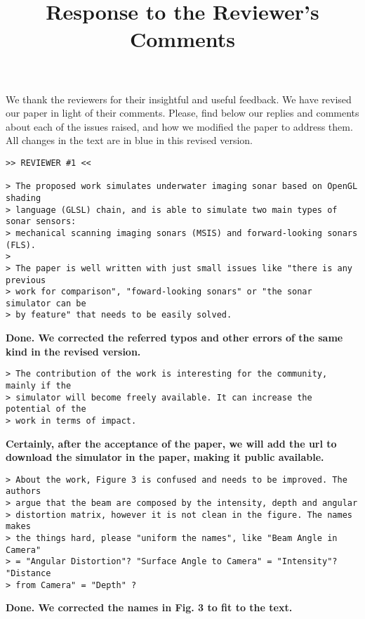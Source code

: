 \documentclass{article}
\title{Response to the Reviewer's Comments}
\begin{document}
\maketitle

We thank the reviewers for their insightful and useful feedback. We have
revised our paper in light of their comments. Please, find
below our replies and comments about each of the issues raised, and how
we modified the paper to address them. All changes in the text are in blue
in this revised version.

\begin{verbatim}
>> REVIEWER #1 <<

> The proposed work simulates underwater imaging sonar based on OpenGL shading
> language (GLSL) chain, and is able to simulate two main types of sonar sensors:
> mechanical scanning imaging sonars (MSIS) and forward-looking sonars (FLS).
>
> The paper is well written with just small issues like "there is any previous
> work for comparison", "foward-looking sonars" or "the sonar simulator can be
> by feature" that needs to be easily solved.
\end{verbatim}

\textbf{Done. We corrected the referred typos and other
errors of the same kind in the revised version.}

\begin{verbatim}
> The contribution of the work is interesting for the community, mainly if the
> simulator will become freely available. It can increase the potential of the
> work in terms of impact.
\end{verbatim}

\textbf{Certainly, after the acceptance of the paper, we will add the url to
download the simulator in the paper, making it public available.}

\begin{verbatim}
> About the work, Figure 3 is confused and needs to be improved. The authors
> argue that the beam are composed by the intensity, depth and angular
> distortion matrix, however it is not clean in the figure. The names makes
> the things hard, please "uniform the names", like "Beam Angle in Camera"
> = "Angular Distortion"? "Surface Angle to Camera" = "Intensity"? "Distance
> from Camera" = "Depth" ?
\end{verbatim}

\textbf{Done. We corrected the names in Fig. 3 to fit to the text.}
\end{document}
